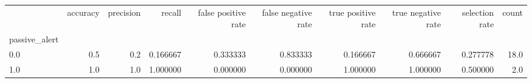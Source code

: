\begin{tabular}{lrrrrrrrrr}
\toprule
{} &  accuracy &  precision &    recall &  false positive rate &  false negative rate &  true positive rate &  true negative rate &  selection rate &  count \\
passive\_alert &           &            &           &                      &                      &                     &                     &                 &        \\
\midrule
0.0           &       0.5 &        0.2 &  0.166667 &             0.333333 &             0.833333 &            0.166667 &            0.666667 &        0.277778 &   18.0 \\
1.0           &       1.0 &        1.0 &  1.000000 &             0.000000 &             0.000000 &            1.000000 &            1.000000 &        0.500000 &    2.0 \\
\bottomrule
\end{tabular}
